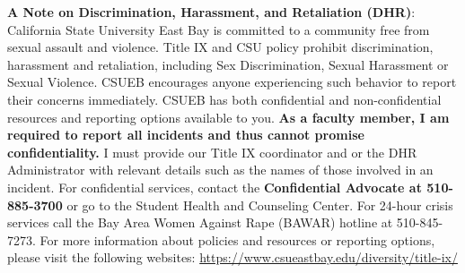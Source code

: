 \documentclass[12pt]{report}
\begin{document}
\textbf{A Note on Discrimination, Harassment, and Retaliation (DHR)}:\\
California State University East Bay is committed to a community free from sexual assault and violence. Title IX and CSU policy prohibit discrimination, harassment and retaliation, including Sex Discrimination, Sexual Harassment or Sexual Violence. CSUEB encourages anyone experiencing such behavior to report their concerns immediately. CSUEB has both confidential and non-confidential resources and reporting options available to you. \textbf{As a faculty member, I am required to report all incidents and thus cannot promise confidentiality.} I must provide our Title IX coordinator and or the DHR Administrator with relevant details such as the names of those involved in an incident. For confidential services, contact the \textbf{Confidential Advocate at 510-885-3700} or go to the Student Health and Counseling Center. For 24-hour crisis services call the Bay Area Women Against Rape (BAWAR) hotline at 510-845-7273. For more information about policies and resources or reporting options, please visit the following websites: \url{https://www.csueastbay.edu/diversity/title-ix/}
\end{document}
